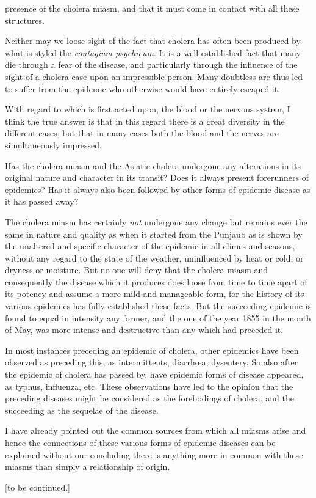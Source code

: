 presence of the cholera miasm, and that it must come in contact with
all these structures.

Neither may we loose sight of the fact that cholera has often been
produced by what is styled the \emph{contagium psychicum}. It is a well-established
fact that many die through a fear of the disease, and particularly
through the influence of the sight of a cholera case upon an
impressible person. Many doubtless are thus led to suffer from the
epidemic who otherwise would have entirely escaped it.

With regard to which is first acted upon, the blood or the nervous
system, I think the true answer is that in this regard there is a great
diversity in the different cases, but that in many cases both the blood
and the nerves are simultaneously impressed.

\vspace{\baselineskip}

Has the cholera miasm and the Asiatic cholera undergone any alterations
in its original nature and character in its transit? Does it always
present forerunners of epidemics? Has it always also been followed by
other forms of epidemic disease as it has passed away?

The cholera miasm has certainly \emph{not} undergone any change but remains
ever the same in nature and quality as when it started from the
Punjaub as is shown by the unaltered and specific character of the epidemic
in all climes and seasons, without any regard to the state of the
weather, uninfluenced by heat or cold, or dryness or moisture. But no
one will deny that the cholera miasm and consequently the disease
which it produces does loose from time to time apart of its potency and
assume a more mild and manageable form, for the history of its various
epidemics has fully established these facts. But the succeeding epidemic
is found to equal in intensity any former, and the one of the year
1855 in the month of May, was more intense and destructive than any
which had preceded it.

In most instances preceding an epidemic of cholera, other epidemics
have been observed as preceding this, as intermittents, diarrhœa, dysentery.
So also after the epidemic of cholera has passed by, have
epidemic forms of disease appeared, as typhus, influenza, etc. These
observations have led to the opinion that the preceding diseases might
be considered as the forebodings of cholera, and the succeeding as the
sequelae of the disease.

I have already pointed out the common sources from which all
miasms arise and hence the connections of these various forms of epidemic
diseases can be explained without our concluding there is anything
more in common with these miasms than simply a relationship
of origin.

[to be continued.]
\endinput